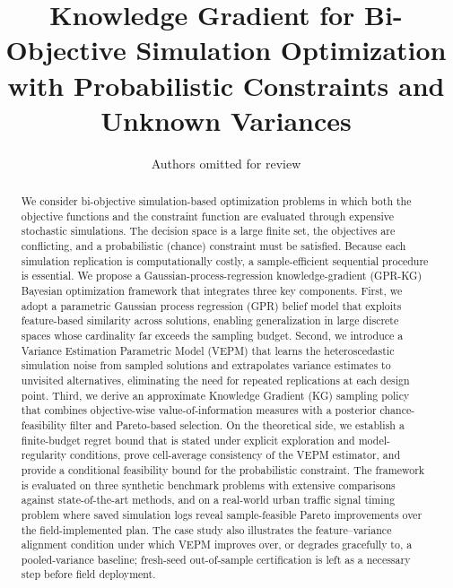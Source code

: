 \documentclass[12pt]{article}
\title{\textbf{Knowledge Gradient for Bi-Objective Simulation Optimization\\ with Probabilistic Constraints and Unknown Variances}}
\author{
  Authors omitted for review
}
\date{}
\theoremstyle{plain}
\theoremstyle{definition}
\theoremstyle{remark}
\begin{document}
\maketitle

\begin{abstract}
We consider bi-objective simulation-based optimization problems in which
both the objective functions and the constraint function are evaluated
through expensive stochastic simulations.  The decision space is a large
finite set, the objectives are conflicting, and a probabilistic
(chance) constraint must be satisfied.  Because each simulation
replication is computationally costly, a sample-efficient sequential
procedure is essential.  We propose a Gaussian-process-regression
knowledge-gradient (GPR-KG) Bayesian optimization framework that
integrates three key components.  First, we adopt a parametric
Gaussian process regression (GPR) belief model that exploits
feature-based similarity across solutions, enabling generalization in
large discrete spaces whose cardinality far exceeds the sampling
budget.  Second, we introduce a Variance Estimation Parametric Model
(VEPM) that learns the heteroscedastic simulation noise from sampled
solutions and extrapolates variance estimates to unvisited alternatives,
eliminating the need for repeated replications at each design point.
Third, we derive an approximate Knowledge Gradient (KG) sampling policy
that combines objective-wise value-of-information measures with a
posterior chance-feasibility filter and Pareto-based selection.  On
the theoretical side, we establish a finite-budget regret bound that
is stated under explicit exploration and model-regularity conditions,
prove cell-average consistency of the VEPM estimator, and provide
a conditional feasibility bound for the probabilistic constraint.  The
framework is evaluated on three synthetic benchmark problems with
extensive comparisons against state-of-the-art methods, and on a
real-world urban traffic signal timing problem where saved simulation
logs reveal sample-feasible Pareto improvements over the
field-implemented plan.  The case study also illustrates the
feature--variance alignment condition under which VEPM improves over,
or degrades gracefully to, a pooled-variance baseline; fresh-seed
out-of-sample certification is left as a necessary step before field
deployment.
\end{abstract}
\end{document}
